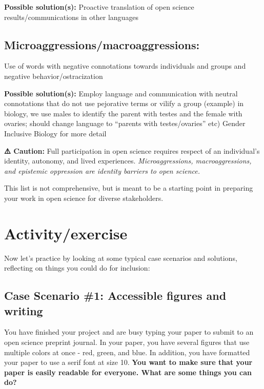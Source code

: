 \documentclass[
  letterpaper,
  DIV=11,
  numbers=noendperiod]{scrreport}
\begin{document}
\textbf{Possible solution(s):} Proactive translation of open science
results/communications in other languages

\hypertarget{microaggressionsmacroaggressions}{%
\subsection{Microaggressions/macroaggressions:}\label{microaggressionsmacroaggressions}}

Use of words with negative connotations towards individuals and groups
and negative behavior/ostracization

\textbf{Possible solution(s):} Employ language and communication with
neutral connotations that do not use pejorative terms or vilify a group
(example) in biology, we use males to identify the parent with testes
and the female with ovaries; should change language to ``parents with
testes/ovaries'' etc) Gender Inclusive Biology for more detail

\textbf{⚠️ Caution:} Full participation in open science requires respect
of an individual's identity, autonomy, and lived experiences.
\emph{Microaggressions, macroaggressions, and epistemic oppression are
identity barriers to open science.}

This list is not comprehensive, but is meant to be a starting point in
preparing your work in open science for diverse stakeholders.

\hypertarget{activityexercise}{%
\section{Activity/exercise}\label{activityexercise}}

Now let's practice by looking at some typical case scenarios and
solutions, reflecting on things you could do for inclusion:

\hypertarget{case-scenario-1-accessible-figures-and-writing}{%
\subsection{Case Scenario \#1: Accessible figures and
writing}\label{case-scenario-1-accessible-figures-and-writing}}

You have finished your project and are busy typing your paper to submit
to an open science preprint journal. In your paper, you have several
figures that use multiple colors at once - red, green, and blue. In
addition, you have formatted your paper to use a serif font at size 10.
\textbf{You want to make sure that your paper is easily readable for
everyone. What are some things you can do?}
\end{document}
